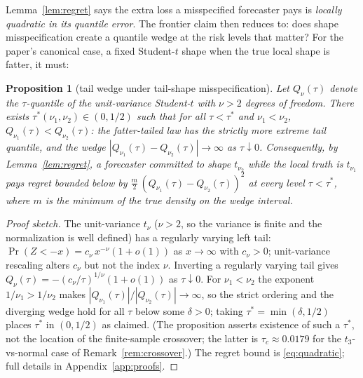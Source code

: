 \documentclass[11pt]{article}
\newtheorem{proposition}{Proposition}
\theoremstyle{remark}
\begin{document}
Lemma~\ref{lem:regret} says the extra loss a misspecified forecaster
pays is \emph{locally quadratic in its quantile error}. The frontier claim then
reduces to: does shape misspecification create a quantile wedge at the
risk levels that matter? For the paper's canonical case, a fixed Student-$t$ shape when the true local shape is fatter, it must:

\begin{proposition}[tail wedge under tail-shape misspecification]
\label{prop:wedge}
Let $Q_\nu(\tau)$ denote the $\tau$-quantile of the unit-variance
Student-$t$ with $\nu > 2$ degrees of freedom. There exists
$\tau^*(\nu_1,\nu_2) \in (0, 1/2)$ such that for all
$\tau < \tau^*$ and $\nu_1 < \nu_2$,
$Q_{\nu_1}(\tau) < Q_{\nu_2}(\tau)$: the fatter-tailed law has the
strictly more extreme tail quantile, and the wedge
$|Q_{\nu_1}(\tau) - Q_{\nu_2}(\tau)| \to \infty$ as
$\tau \downarrow 0$. Consequently, by Lemma~\ref{lem:regret}, a
forecaster committed to shape $t_{\nu_2}$ while the local truth is
$t_{\nu_1}$ pays regret bounded below by
$\tfrac{m}{2}\,(Q_{\nu_1}(\tau) - Q_{\nu_2}(\tau))^2$ at every level
$\tau < \tau^*$, where $m$ is the minimum of the true density on the
wedge interval.
\end{proposition}
\begin{proof}[Proof sketch]
The unit-variance $t_\nu$ ($\nu>2$, so the variance is finite and the
normalization is well defined) has a regularly varying left tail:
$\Pr(Z < -x) = c_\nu\, x^{-\nu}(1 + o(1))$ as $x \to \infty$ with
$c_\nu > 0$; unit-variance rescaling alters $c_\nu$ but not the index
$\nu$. Inverting a regularly varying tail \citep{embrechts1997} gives
$Q_\nu(\tau) = -(c_\nu/\tau)^{1/\nu}(1+o(1))$ as $\tau \downarrow 0$.
For $\nu_1 < \nu_2$ the exponent $1/\nu_1 > 1/\nu_2$ makes
$|Q_{\nu_1}(\tau)| / |Q_{\nu_2}(\tau)| \to \infty$, so the strict
ordering and the diverging wedge hold for all $\tau$ below some
$\delta > 0$; taking $\tau^* = \min(\delta, 1/2)$ places $\tau^*$ in
$(0,1/2)$ as claimed. (The proposition asserts existence of such
a $\tau^*$, not the location of the finite-sample crossover; the latter
is $\tau_c\approx 0.0179$ for the $t_3$-vs-normal case of
Remark~\ref{rem:crossover}.) The regret bound is \eqref{eq:quadratic};
full details in Appendix~\ref{app:proofs}.
\end{proof}
\end{document}
